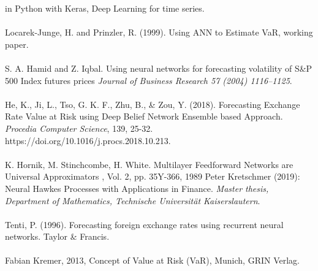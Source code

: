 \documentclass[a4paper,11pt,oneside]{book}
\begin{document}
in Python with Keras, Deep Learning for time series.\\\\
Locarek-Junge, H. and Prinzler, R. (1999). Using ANN to Estimate VaR, working
paper.\\\\
S. A. Hamid and Z. Iqbal. Using neural networks for forecasting volatility of S\&P 500 Index futures prices \textit{Journal of Business Research 57 (2004) 1116–1125}.\\\\
He, K., Ji, L., Tso, G. K. F., Zhu, B., \& Zou, Y. (2018). Forecasting Exchange Rate Value at Risk using Deep Belief Network Ensemble based Approach. \textit{Procedia Computer Science}, 139, 25-32.
https://doi.org/10.1016/j.procs.2018.10.213.\\\\
K. Hornik, M. Stinchcombe, H. White. Multilayer Feedforward Networks are Universal Approximators , Vol. 2, pp. 35Y-366, 1989
Peter Kretschmer (2019): Neural Hawkes Processes with Applications
in Finance. \textit{Master thesis, Department of Mathematics, Technische Universität Kaiserslautern}.\\\\
Tenti, P. (1996). Forecasting foreign exchange rates using recurrent neural networks. Taylor \& Francis.\\\\
Fabian Kremer, 2013, Concept of Value at Risk (VaR), Munich, GRIN Verlag.



\listoffigures
\listoftables
\end{document}
